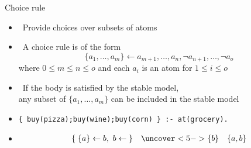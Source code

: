 \begin{frame}[fragile]{Choice rule}
  \label{eqn:choice:rule}
  \begin{itemize}
  \item {} \ Provide choices over subsets of atoms
    \smallskip
  \item {} \ A \alert{choice rule} is of the form
    \[
    \{a_1,\dots,a_m\}\leftarrow a_{m+1},\dots,a_n,\neg a_{n+1},\dots,\neg a_o
    \]
    where $0\leq m\leq n\leq o$ and each $a_i$ is an atom for $1\leq i\leq o$
    \smallskip
  \item<2->  \ If the body is satisfied by the stable model,\\
    any subset of $\{a_1,\dots,a_m\}$ can be included in the stable model
    \medskip
  \item<only@3> 
\begin{lstlisting}[basicstyle=\ttfamily\small]
{ buy(pizza);buy(wine);buy(corn) } :- at(grocery).
\end{lstlisting}
  \item<only@4-> 
    \begin{align*}
      & \{\;\{a\}\leftarrow b,\ b\leftarrow\;\}&\uncover<5->{\{b\}\quad\{a,b\}}
    \end{align*}
  \end{itemize}
\end{frame}
